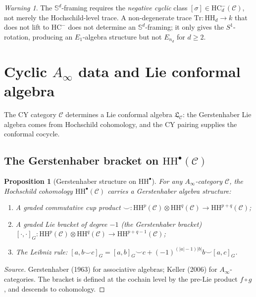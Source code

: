 \documentclass[11pt]{article}
\theoremstyle{plain}
\newtheorem{proposition}[theorem]{Proposition}
\theoremstyle{definition}
\theoremstyle{remark}
\newtheorem{warning}[theorem]{Warning}
\newcommand{\Ainf}{A_\infty}
\newcommand{\Eone}{E_1}
\newcommand{\En}{E_n}
\newcommand{\HH}{\mathrm{HH}}
\newcommand{\HC}{\mathrm{HC}}
\newcommand{\Tr}{\mathrm{Tr}}
\newcommand{\Sd}{\mathbb{S}^d}
\newcommand{\cC}{\mathcal{C}}
\newcommand{\frakL}{\mathfrak{L}}
\begin{document}
\begin{warning}
\label{warn:cy-trace-refinement}
The $\Sd$-framing requires the \emph{negative cyclic} class $[\sigma] \in \HC^-_d(\cC)$, not merely the Hochschild-level trace. A non-degenerate trace $\Tr \colon \HH_d \to k$ that does not lift to $\HC^-$ does not determine an $\Sd$-framing; it only gives the $S^1$-rotation, producing an $\Eone$-algebra structure but not $\En_d$ for $d \geq 2$.
\end{warning}

\section{Cyclic $\Ainf$ data and Lie conformal algebra}
\label{sec:step1}

The CY category $\cC$ determines a Lie conformal algebra
$\frakL_\cC$: the Gerstenhaber Lie algebra comes from Hochschild
cohomology, and the CY pairing supplies the conformal cocycle.

\subsection{The Gerstenhaber bracket on $\HH^\bullet(\cC)$}
\label{sec:gerstenhaber}

\begin{proposition}[Gerstenhaber structure on $\HH^\bullet$]
\label{prop:gerstenhaber}
For any $\Ainf$-category $\cC$, the Hochschild cohomology $\HH^\bullet(\cC)$ carries a Gerstenhaber algebra structure:
\begin{enumerate}[label=(\roman*)]
\item A graded commutative cup product $\smile \colon \HH^p(\cC) \otimes \HH^q(\cC) \to \HH^{p+q}(\cC)$;
\item A graded Lie bracket of degree $-1$ (the Gerstenhaber bracket) $[\cdot, \cdot]_G \colon \HH^p(\cC) \otimes \HH^q(\cC) \to \HH^{p+q-1}(\cC)$;
\item The Leibniz rule: $[a, b \smile c]_G = [a,b]_G \smile c + (-1)^{(|a|-1)|b|} b \smile [a,c]_G$.
\end{enumerate}
\end{proposition}

\begin{proof}[Source]
Gerstenhaber (1963) for associative algebras; Keller (2006) for $\Ainf$-categories. The bracket is defined at the cochain level by the pre-Lie product $f \circ g$, and descends to cohomology.
\end{proof}
\end{document}
